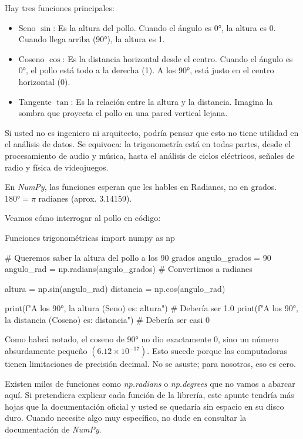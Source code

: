 Hay tres funciones principales:
\begin{itemize}
    \item Seno \(\sin\): Es la altura del pollo. Cuando el ángulo es 0°, la altura es 0. Cuando llega arriba (90°), la altura es 1.
    \item Coseno \(\cos \): Es la distancia horizontal desde el centro. Cuando el ángulo es 0°, el pollo está todo a la derecha (1). A los 90°, está justo en el centro horizontal (0).
    \item Tangente \(\tan\): Es la relación entre la altura y la distancia. Imagina la sombra que proyecta el pollo en una pared vertical lejana.
\end{itemize}

Si usted no es ingeniero ni arquitecto, podría pensar que esto no tiene utilidad en el análisis de datos. Se equivoca: la trigonometría está en todas partes, desde el procesamiento de audio y música, hasta el análisis de ciclos eléctricos, señales de radio y física de videojuegos.

\begin{nota}
    En \textit{NumPy}, las funciones esperan que les hables en Radianes, no en grados. \(180°= \pi\) radianes (aprox. 3.14159).
\end{nota}

Veamos cómo interrogar al pollo en código:

\begin{pycode}{Funciones trigonométricas}
import numpy as np

# Queremos saber la altura del pollo a los 90 grados
angulo_grados = 90
angulo_rad = np.radians(angulo_grados) # Convertimos a radianes

altura = np.sin(angulo_rad)
distancia = np.cos(angulo_rad)

print(f"A los 90°, la altura (Seno) es: {altura}") # Debería ser 1.0
print(f"A los 90°, la distancia (Coseno) es: {distancia}") # Debería ser casi 0
\end{pycode}

Como habrá notado, el coseno de 90° no dio exactamente 0, sino un número absurdamente pequeño \((6.12\times10^{-17})\). Esto sucede porque las computadoras tienen limitaciones de precisión decimal. No se asuste; para nosotros, eso es cero.

Existen miles de funciones como \textit{np.radians} o \textit{np.degrees} que no vamos a abarcar aquí. Si pretendiera explicar cada función de la librería, este apunte tendría más hojas que la documentación oficial y usted se quedaría sin espacio en su disco duro. Cuando necesite algo muy específico, no dude en consultar la documentación de \textit{NumPy}.

